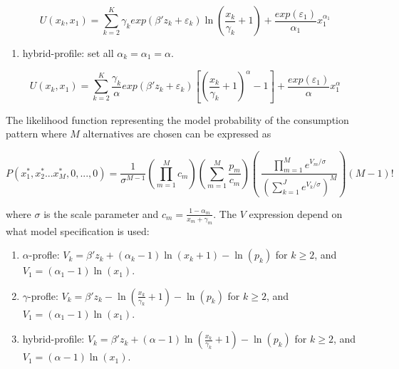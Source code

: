 \begin{equation}
\label{eq:gamma}
U(x_k, x_1) = \sum_{k=2}^{K} \gamma_k exp(\beta'z_k+\varepsilon_k) \ln\left( \frac{x_k}{\gamma_k} + 1 \right) + \frac{exp(\varepsilon_1)}{\alpha_1}x_1^{\alpha_1}
\end{equation}

\begin{enumerate}
\def\labelenumi{\arabic{enumi}.}
\setcounter{enumi}{2}
\tightlist
\item
  hybrid-profile: set all \(\alpha_k=\alpha_1=\alpha\).
\end{enumerate}

\begin{equation}
\label{eq:hybrid}
U(x_k, x_1) = \sum_{k=2}^{K} \frac{\gamma_k}{\alpha} exp(\beta'z_k+\varepsilon_k) \left[ \left( \frac{x_k}{\gamma_k} + 1 \right)^{\alpha} - 1 \right] + \frac{exp(\varepsilon_1)}{\alpha}x_1^{\alpha}
\end{equation}

The likelihood function representing the model probability of the
consumption pattern where \(M\) alternatives are chosen can be expressed
as \citet{bhatmultiple2008}

\begin{equation}
\label{eq:ll_base}
P(x^{*}_1,x^{*}_2...x^{*}_M,0,...,0) = \frac{1}{\sigma^{M-1}} \left(\prod_{m=1}^M c_m \right)\left(\sum_{m=1}^M \frac{p_m}{c_m} \right) \left( \ \frac{\prod_{m=1}^M e^{V_m/\sigma}}{ \left( \sum_{k=1}^J e^{V_k/\sigma} \right)^M }\right)(M-1)!
\end{equation}

\noindent where \(\sigma\) is the scale parameter and
\(c_m = \frac{1-\alpha_m}{x_m+ \gamma_m}\). The \(V\) expression depend
on what model specification is used:

\begin{enumerate}
\def\labelenumi{\arabic{enumi}.}
\item
  \(\alpha\)-profle:
  \(V_k = \beta' z_k + (\alpha_k-1)\ln\left( x_k + 1 \right) - \ln \left(p_k\right)\)
  for \(k \geq 2\), and \(V_1 = (\alpha_1-1)\ln(x_1)\).
\item
  \(\gamma\)-profle:
  \(V_k = \beta' z_k - \ln\left( \frac{x_k}{\gamma_k} + 1 \right) - \ln \left(p_k\right)\)
  for \(k \geq 2\), and \(V_1 = (\alpha_1-1)\ln(x_1)\).
\item
  hybrid-profile:
  \(V_k = \beta' z_k + (\alpha-1)\ln\left( \frac{x_k}{\gamma_k} + 1 \right) - \ln \left(p_k\right)\)
  for \(k \geq 2\), and \(V_1 = (\alpha-1)\ln(x_1)\).
\end{enumerate}

